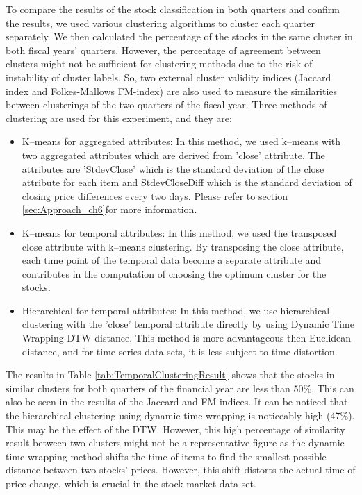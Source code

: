 To compare the results of the stock classification in both quarters and confirm the results, we used various clustering algorithms to cluster each quarter separately. We then calculated the percentage of the stocks in the same cluster in both fiscal years' quarters. However, the percentage of agreement between clusters might not be sufficient for clustering methods due to the risk of instability of cluster labels. So, two external cluster validity indices (Jaccard index and Folkes-Mallows FM-index) are also used to measure the similarities between clusterings of the two quarters of the fiscal year. Three methods of clustering are used for this experiment, and they are:
\begin{itemize}
    
    \item K--means for aggregated attributes: In this method, we used k--means with two aggregated attributes which are derived from 'close' attribute. The attributes are 'StdevClose' which is the standard deviation of the close attribute for each item and StdevCloseDiff which is the standard deviation of closing price differences every two days. Please refer to section \ref{sec:Approach_ch6}for more information.
    
    \item K--means for temporal attributes: In this method, we used the transposed close attribute with k--means clustering. By transposing the close attribute, each time point of the temporal data become a separate attribute and contributes in the computation of choosing the optimum cluster for the stocks.
    
    \item Hierarchical for temporal attributes: In this method, we use hierarchical clustering with the 'close' temporal attribute directly by using Dynamic Time Wrapping DTW \cite{Berndt1994} distance. This method is more advantageous then Euclidean distance, and for time series data sets, it is less subject to time distortion.
    
\end{itemize}

The results in Table \ref{tab:TemporalClusteringResult} shows that the stocks in similar clusters for both quarters of the financial year are less than 50\%. This can also be seen in the results of the Jaccard and FM indices. It can be noticed that the hierarchical clustering using dynamic time wrapping is noticeably high (47\%). This may be the effect of the DTW. However, this high percentage of similarity result between two clusters might not be a representative figure as the dynamic time wrapping method shifts the time of items to find the smallest possible distance between two stocks' prices. However, this shift distorts the actual time of price change, which is crucial in the stock market data set.

